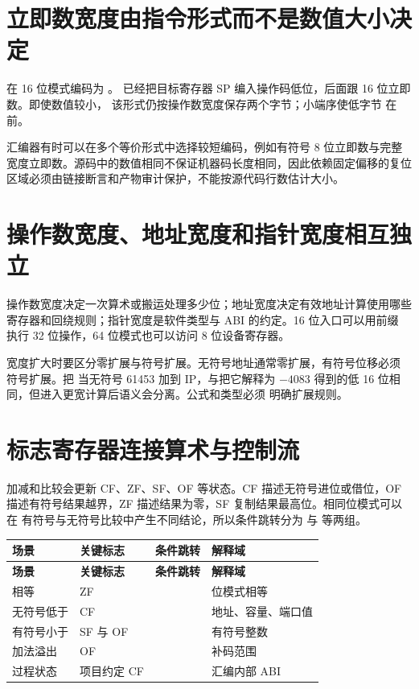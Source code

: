 \section{立即数宽度由指令形式而不是数值大小决定}

 在 16 位模式编码为 。
已经把目标寄存器 SP 编入操作码低位，后面跟 16 位立即数。即使数值较小，
该形式仍按操作数宽度保存两个字节；小端序使低字节  在前。

汇编器有时可以在多个等价形式中选择较短编码，例如有符号 8 位立即数与完整
宽度立即数。源码中的数值相同不保证机器码长度相同，因此依赖固定偏移的复位
区域必须由链接断言和产物审计保护，不能按源代码行数估计大小。

\section{操作数宽度、地址宽度和指针宽度相互独立}

操作数宽度决定一次算术或搬运处理多少位；地址宽度决定有效地址计算使用哪些
寄存器和回绕规则；指针宽度是软件类型与 ABI 的约定。16 位入口可以用前缀
执行 32 位操作，64 位模式也可以访问 8 位设备寄存器。

宽度扩大时要区分零扩展与符号扩展。无符号地址通常零扩展，有符号位移必须
符号扩展。把  当无符号 61453 加到 IP，与把它解释为
\(-4083\) 得到的低 16 位相同，但进入更宽计算后语义会分离。公式和类型必须
明确扩展规则。

\section{标志寄存器连接算术与控制流}

加减和比较会更新 CF、ZF、SF、OF 等状态。CF 描述无符号进位或借位，OF
描述有符号结果越界，ZF 描述结果为零，SF 复制结果最高位。相同位模式可以在
有符号与无符号比较中产生不同结论，所以条件跳转分为  与
 等两组。

\begin{longtable}{L{0.18\textwidth}L{0.23\textwidth}L{0.24\textwidth}L{0.23\textwidth}}
\toprule
\textbf{场景} & \textbf{关键标志} & \textbf{条件跳转} & \textbf{解释域}\\
\midrule
\endfirsthead
\toprule
\textbf{场景} & \textbf{关键标志} & \textbf{条件跳转} & \textbf{解释域}\\
\midrule
\endhead
相等 & ZF &  & 位模式相等\\
无符号低于 & CF &  & 地址、容量、端口值\\
有符号小于 & SF 与 OF &  & 有符号整数\\
加法溢出 & OF &  & 补码范围\\
过程状态 & 项目约定 CF &  & 汇编内部 ABI\\
\bottomrule
\end{longtable}

